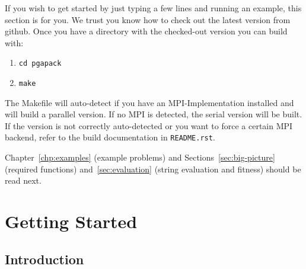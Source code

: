 \documentclass{report}
\begin{document}
If you wish to get started by just typing a few lines and running an example,
this section is for you. We trust you know how to check out the latest
version from github. Once you have a directory with the checked-out
version you can build with:

\begin{enumerate}
\item \verb+cd pgapack+
\item \verb+make+
\end{enumerate}

The Makefile will auto-detect if you have an MPI-Implementation
installed and will build a parallel version. If no MPI is detected, the
serial version will be built. If the version is not correctly
auto-detected or you want to force a certain MPI backend, refer to
the build documentation in \verb+README.rst+.

Chapter~\ref{chp:examples} (example problems) and
Sections~\ref{sec:big-picture} (required functions) and~\ref{sec:evaluation}
(string evaluation and fitness) should be read next.



\part{Getting Started}\label{part:started}


\chapter{Introduction}\label{chp:intro}
\end{document}
